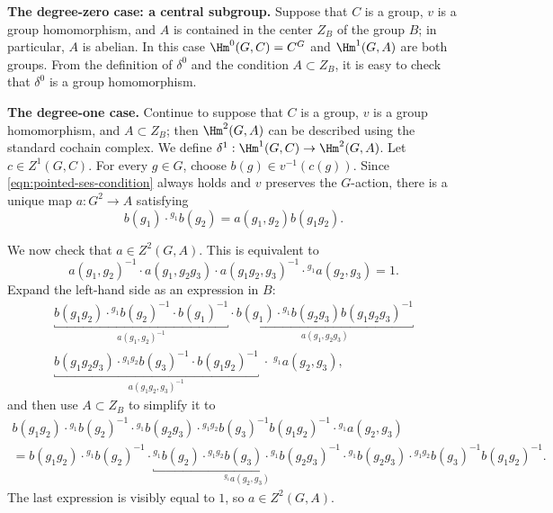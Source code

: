 \textbf{The degree-zero case: a central subgroup.}\;
Suppose that $C$ is a group, $v$ is a group homomorphism, and $A$ is
contained in the center $Z_B$ of the group $B$; in particular, $A$ is
abelian. In this case $\Hm^0(G,C)=C^G$ and $\Hm^1(G,A)$ are both groups.
From the definition of $\delta^0$ and the condition $A\subset Z_B$, it is
easy to check that $\delta^0$ is a group homomorphism.

\textbf{The degree-one case.}\;
Continue to suppose that $C$ is a group, $v$ is a group homomorphism, and
$A\subset Z_B$; then $\Hm^2(G,A)$ can be described using the standard
cochain complex. We define $\delta^1:\Hm^1(G,C)\to\Hm^2(G,A)$. Let
$c\in Z^1(G,C)$. For every $g\in G$, choose
$b(g)\in v^{-1}(c(g))$. Since \eqref{eqn:pointed-ses-condition} always
holds and $v$ preserves the $G$-action, there is a unique map $a:G^2\to A$
satisfying
\[ b(g_1) \cdot {}^{g_1} b(g_2) = a(g_1, g_2) b(g_1 g_2). \]

We now check that $a\in Z^2(G,A)$. This is equivalent to
\[ a(g_1, g_2)^{-1} \cdot a(g_1, g_2 g_3) \cdot a(g_1 g_2, g_3)^{-1} \cdot {}^{g_1} a(g_2, g_3) = 1. \]
Expand the left-hand side as an expression in $B$:
\begin{multline*}
	\underbracket{b(g_1 g_2) \cdot {}^{g_1} b(g_2)^{-1} \cdot b(g_1)^{-1}}_{a(g_1, g_2)^{-1}} \cdot \underbracket{b(g_1) \cdot {}^{g_1} b(g_2 g_3) b(g_1 g_2 g_3)^{-1}}_{a(g_1, g_2 g_3)} \\
	\underbracket{b(g_1 g_2 g_3) \cdot {}^{g_1 g_2} b(g_3)^{-1} \cdot b(g_1 g_2)^{-1}}_{a(g_1 g_2, g_3)^{-1}} \; \cdot \; {}^{g_1} a(g_2, g_3),
\end{multline*}
and then use $A\subset Z_B$ to simplify it to
\begin{multline*}
	b(g_1 g_2) \cdot {}^{g_1} b(g_2)^{-1} \cdot {}^{g_1} b(g_2 g_3) \cdot {}^{g_1 g_2} b(g_3)^{-1}  b(g_1 g_2)^{-1} \cdot {}^{g_1} a(g_2, g_3) \\
	= b(g_1 g_2) \cdot {}^{g_1} b(g_2)^{-1} \cdot \underbracket{{}^{g_1} b(g_2) \cdot {}^{g_1 g_2} b(g_3) \cdot {}^{g_1} b(g_2 g_3)^{-1}}_{{}^{g_1} a(g_2, g_3)} \cdot {}^{g_1} b(g_2 g_3) \cdot {}^{g_1 g_2} b(g_3)^{-1}  b(g_1 g_2)^{-1} .
\end{multline*}
The last expression is visibly equal to $1$, so $a\in Z^2(G,A)$.

